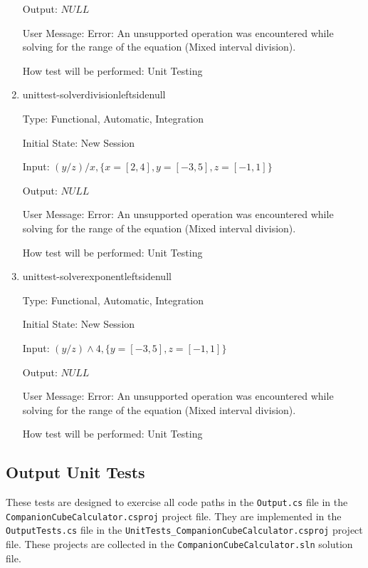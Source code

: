 \documentclass[12pt, titlepage]{article}
\begin{document}
\begin{enumerate}
	Output: $NULL$
	
	User Message: Error: An unsupported operation was encountered while solving 
	for the range of the equation (Mixed interval division).
	
	How test will be performed: Unit Testing\\
	
	\item{unittest-solverdivisionleftsidenull}
	
	Type: Functional, Automatic, Integration
	
	Initial State: New Session
	
	Input: $(y/z) / x, \{ x = [2,4], y = [-3,5], z = [-1,1] \}$
	
	Output: $NULL$
	
	User Message: Error: An unsupported operation was encountered while solving 
	for the range of the equation (Mixed interval division).
	
	How test will be performed: Unit Testing\\
	
	\item{unittest-solverexponentleftsidenull}
	
	Type: Functional, Automatic, Integration
	
	Initial State: New Session
	
	Input: $(y/z) \wedge 4, \{ y = [-3,5], z = [-1,1] \}$
	
	Output: $NULL$
	
	User Message: Error: An unsupported operation was encountered while solving 
	for the range of the equation (Mixed interval division).
	
	How test will be performed: Unit Testing\\

\end{enumerate}

\subsection{Output Unit Tests}
These tests are designed to exercise all code paths in the \texttt{Output.cs} 
file in the \texttt{CompanionCubeCalculator.csproj} project file. They are 
implemented in the \texttt{OutputTests.cs} file in the 
\texttt{UnitTests\_CompanionCubeCalculator.csproj} project file. These projects 
are collected in the \texttt{CompanionCubeCalculator.sln} solution file.
\end{document}
